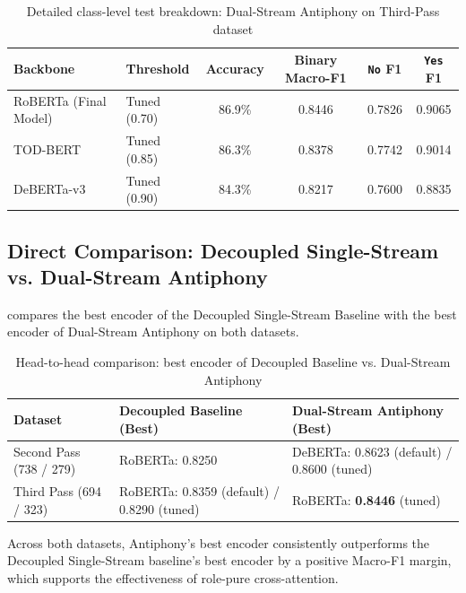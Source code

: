 \begin{table}[htbp]
  \centering
  \small
  \caption{Detailed class-level test breakdown: Dual-Stream Antiphony on Third-Pass dataset}
  \label{tab:breakdown-third-pass}
  \begin{tabularx}{\textwidth}{llcccc}
    \toprule
    \textbf{Backbone} & \textbf{Threshold} & \textbf{Accuracy} & \textbf{Binary Macro-F1} & \textbf{\texttt{No} F1} & \textbf{\texttt{Yes} F1} \\
    \midrule
    RoBERTa (Final Model) & Tuned (0.70) & 86.9\% & 0.8446 & 0.7826 & 0.9065 \\
    \rowcolor{lightbg}
    TOD-BERT & Tuned (0.85) & 86.3\% & 0.8378 & 0.7742 & 0.9014 \\
    DeBERTa-v3 & Tuned (0.90) & 84.3\% & 0.8217 & 0.7600 & 0.8835 \\
    \bottomrule
  \end{tabularx}
\end{table}

\subsection{Direct Comparison: Decoupled Single-Stream vs. Dual-Stream Antiphony}
 compares the best encoder of the Decoupled Single-Stream Baseline with the best encoder of Dual-Stream Antiphony on both datasets.

\begin{table}[htbp]
  \centering
  \small
  \caption{Head-to-head comparison: best encoder of Decoupled Baseline vs. Dual-Stream Antiphony}
  \label{tab:v13-vs-v14}
  \begin{tabularx}{\textwidth}{lYY}
    \toprule
    \textbf{Dataset} & \textbf{Decoupled Baseline (Best)} & \textbf{Dual-Stream Antiphony (Best)} \\
    \midrule
    Second Pass (738 / 279) & RoBERTa: 0.8250 & DeBERTa: 0.8623 (default) / 0.8600 (tuned) \\
    Third Pass (694 / 323) & RoBERTa: 0.8359 (default) / 0.8290 (tuned) & RoBERTa: \textbf{0.8446} (tuned) \\
    \bottomrule
  \end{tabularx}
\end{table}
Across both datasets, Antiphony's best encoder consistently outperforms the Decoupled Single-Stream baseline's best encoder by a positive Macro-F1 margin, which supports the effectiveness of role-pure cross-attention.


